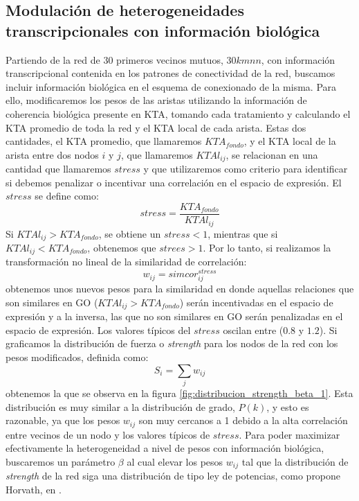 \subsection{Modulación de heterogeneidades transcripcionales con información biológica}
Partiendo de la red de 30 primeros vecinos mutuos, $30kmnn$, con información transcripcional contenida en los patrones de conectividad de la red, buscamos incluir información biológica en el esquema de conexionado de la misma. Para ello, modificaremos los pesos de las aristas utilizando la información de coherencia biológica presente en KTA, tomando cada tratamiento y calculando el KTA promedio de toda la red y el KTA local de cada arista. Estas dos cantidades, el KTA promedio, que llamaremos $KTA_{fondo}$, y el KTA local de la arista entre dos nodos $i$ y $j$, que llamaremos $KTAl_{ij}$, se relacionan en una cantidad que llamaremos $stress$ y que utilizaremos como criterio para identificar si debemos penalizar o incentivar una correlación en el espacio de expresión. El $stress$ se define como:
\begin{equation}
	stress = \frac{KTA_{fondo}}{KTAl_{ij}}
	\label{eq:stress}
\end{equation}
Si $KTAl_{ij} > KTA_{fondo}$, se obtiene un $stress < 1$, mientras que si $KTAl_{ij} < KTA_{fondo}$, obtenemos que $strees > 1$. Por lo tanto, si realizamos la transformación no lineal de la similaridad de correlación:
\begin{equation}
	w_{ij} = simcor_{ij}^{stress}
	\label{eq:stress}
\end{equation}
obtenemos unos nuevos pesos para la similaridad en donde aquellas relaciones que son similares en GO ($KTAl_{ij} > KTA_{fondo}$) serán incentivadas en el espacio de expresión y a la inversa, las que no son similares en GO serán penalizadas en el espacio de expresión. Los valores típicos del $stress$ oscilan entre ($0.8$ y $1.2$). Si graficamos la distribución de fuerza o \textit{strength} para los nodos de la red con los pesos modificados, definida como:
\begin{equation}
	S_i = \sum_j w_{ij}
	\label{eq:strength}
\end{equation}
obtenemos la que se observa en la figura \ref{fig:distribucion_strength_beta_1}. Esta distribución es muy similar a la distribución de grado, $P(k)$, y esto es razonable, ya que los pesos $w_{ij}$ son muy cercanos a 1 debido a la alta correlación entre vecinos de un nodo y los valores típicos de $stress$. Para poder maximizar efectivamente la heterogeneidad a nivel de pesos con información biológica, buscaremos un parámetro $\beta$ al cual elevar los pesos $w_{ij}$ tal que la distribución de \textit{strength} de la red siga una distribución de tipo ley de potencias, como propone Horvath, en \cite{Horvath2005}.\\\\
